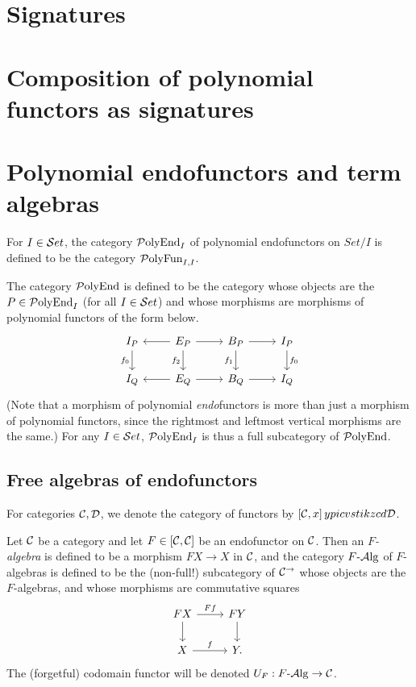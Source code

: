 \newcommand{\PolyEnd}{{\mathrm{\cP olyEnd}}}
\newcommand{\PolyFun}{{\mathrm{\cP olyFun}}}
\newcommand{\PolyMnd}{{\mathrm{\cP olyMnd}}}

\section{Signatures}
\section{Composition of polynomial functors as signatures}

\section{Polynomial endofunctors and term algebras}
For $I\in{\mathcal{S} et}$, the category $\PolyEnd_I$ of polynomial endofunctors on $Set/I$
is defined to be the category $\PolyFun_{I,I}$.

The category $\PolyEnd$ is defined to be the category whose objects are the $P \in
\PolyEnd_I$ (for all $I \in {\mathcal{S} et}$) and whose morphisms are morphisms of polynomial
functors of the form below.
\begin{displaymath}
  \begin{tikzcd}
    I_P \arrow[d,"f_0"']
    &E_P %
    \arrow[l] \arrow[r] \arrow[d,"f_2"']
    &B_P \ar[r] \ar[d,"f_1"']
    &I_P \ar[d,"f_0"]
    \\
    I_Q
    &E_Q \ar[l] \ar[r]
    &B_Q \ar[r]
    &I_Q
  \end{tikzcd}
\end{displaymath}
(Note that a morphism of polynomial \emph{endo}functors is more than just a
morphism of polynomial functors, since the rightmost and leftmost vertical
morphisms are the same.) For any $I \in {\mathcal{S} et}$, $\PolyEnd_I$ is thus a full
subcategory of $\PolyEnd$.

\subsection{Free algebras of endofunctors}
\begin{notation}
  For categories $\mathcal{C}, \mathcal{D}$, we denote the category of functors by $\left[\mathcal{C},x\right]y pic vs tikz cd\mathcal{D}$.
\end{notation}

Let $\mathcal{C}$ be a category and let $F\in [\mathcal{C},\mathcal{C}]$ be an endofunctor on $\mathcal{C}$.
Then an \emph{$F$-algebra} is defined to be a morphism $FX\to X$ in $\mathcal{C}$, and
the category $F{\text{-} \mathrm{\mathcal{A} lg}}$ of $F$-algebras is defined to be the (non-full!)
subcategory of $\mathcal{C}^\rightarrow$ whose objects are the $F$-algebras, and whose morphisms
are commutative squares
\begin{displaymath}
  \begin{tikzcd}
    FX \ar[d]\ar[r,"Ff"]
    &FY\ar[d]
    \\
    X\ar[r,"f"]
    &Y.
  \end{tikzcd}
\end{displaymath}
The (forgetful) codomain functor will be denoted $U_F:F{\text{-} \mathrm{\mathcal{A} lg}}\to\mathcal{C}$.

